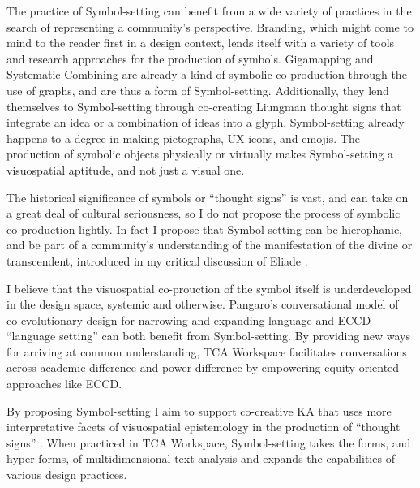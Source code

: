 The practice of Symbol-setting can benefit from a wide variety of practices in the search of representing a community’s perspective. Branding, which might come to mind to the reader first in a design context, lends itself with a variety of tools and research approaches for the production of symbols. Gigamapping \citep{sevaldson_giga-mapping_2011} and Systematic Combining \citep{kjode_entanglement_2024} are already a kind of symbolic co-production through the use of graphs, and are thus a form of Symbol-setting. Additionally, they lend themselves to Symbol-setting through co-creating Liungman thought signs that integrate an idea or a combination of ideas into a glyph. Symbol-setting already happens to a degree in making pictographs, UX icons, and emojis. The production of symbolic objects physically or virtually makes Symbol-setting a visuospatial aptitude, and not just a visual one. 


The historical significance of symbols or “thought signs” \citep{liungman_thought_1995} is vast, and can take on a great deal of cultural seriousness, so I do not propose the process of symbolic co-production lightly. In fact I propose that Symbol-setting can be hierophanic, and be part of a community’s understanding of the manifestation of the divine or transcendent, introduced in my critical discussion of Eliade \citep[p. 11]{eliade_sacred_1987}.

I believe that the visuospatial co-prouction of the symbol itself is underdeveloped in the design space, systemic and otherwise. Pangaro’s conversational model of co-evolutionary design for narrowing and expanding language \citep[p. 185]{pangaro_design_2011} and ECCD “language setting” \citep[p. 8-9]{creative_reaction_lab_equity-centered_2018} can both benefit from Symbol-setting. By providing new ways for arriving at common understanding, TCA Workspace facilitates conversations across academic difference and power difference by empowering equity-oriented approaches like ECCD.  

By proposing Symbol-setting I aim to support co-creative KA that uses more interpretative facets of visuospatial epistemology in the production of “thought signs” \citep{liungman_thought_1995}. When practiced in TCA Workspace, Symbol-setting takes the forms, and hyper-forms, of multidimensional text analysis and expands the capabilities of various design practices.



